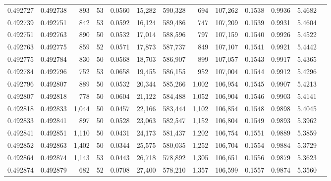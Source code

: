 \begin{tabular}{rrrrrrrrrrrrr}
0.492727 & 0.492738 &   893 &  53 &                                     0.0560 &  15,282 & 590,328 &     694 & 107,262 & 0.1538 & 0.9936 & 5.4682 \\
0.492739 & 0.492751 &   842 &  53 &                                     0.0592 &  16,124 & 589,486 &     747 & 107,209 & 0.1539 & 0.9931 & 5.4604 \\
0.492751 & 0.492763 &   890 &  50 &                                     0.0532 &  17,014 & 588,596 &     797 & 107,159 & 0.1540 & 0.9926 & 5.4522 \\
0.492763 & 0.492775 &   859 &  52 &                                     0.0571 &  17,873 & 587,737 &     849 & 107,107 & 0.1541 & 0.9921 & 5.4442 \\
0.492775 & 0.492784 &   830 &  50 &                                     0.0568 &  18,703 & 586,907 &     899 & 107,057 & 0.1543 & 0.9917 & 5.4365 \\
0.492784 & 0.492796 &   752 &  53 &                                     0.0658 &  19,455 & 586,155 &     952 & 107,004 & 0.1544 & 0.9912 & 5.4296 \\
0.492796 & 0.492807 &   889 &  50 &                                     0.0532 &  20,344 & 585,266 &   1,002 & 106,954 & 0.1545 & 0.9907 & 5.4213 \\
0.492807 & 0.492818 &   778 &  50 &                                     0.0604 &  21,122 & 584,488 &   1,052 & 106,904 & 0.1546 & 0.9903 & 5.4141 \\
0.492818 & 0.492833 & 1,044 &  50 &                                     0.0457 &  22,166 & 583,444 &   1,102 & 106,854 & 0.1548 & 0.9898 & 5.4045 \\
0.492833 & 0.492841 &   897 &  50 &                                     0.0528 &  23,063 & 582,547 &   1,152 & 106,804 & 0.1549 & 0.9893 & 5.3962 \\
0.492841 & 0.492851 & 1,110 &  50 &                                     0.0431 &  24,173 & 581,437 &   1,202 & 106,754 & 0.1551 & 0.9889 & 5.3859 \\
0.492852 & 0.492863 & 1,402 &  50 &                                     0.0344 &  25,575 & 580,035 &   1,252 & 106,704 & 0.1554 & 0.9884 & 5.3729 \\
0.492864 & 0.492874 & 1,143 &  53 &                                     0.0443 &  26,718 & 578,892 &   1,305 & 106,651 & 0.1556 & 0.9879 & 5.3623 \\
0.492874 & 0.492879 &   682 &  52 &                                     0.0708 &  27,400 & 578,210 &   1,357 & 106,599 & 0.1557 & 0.9874 & 5.3560 \\

\end{tabular}
